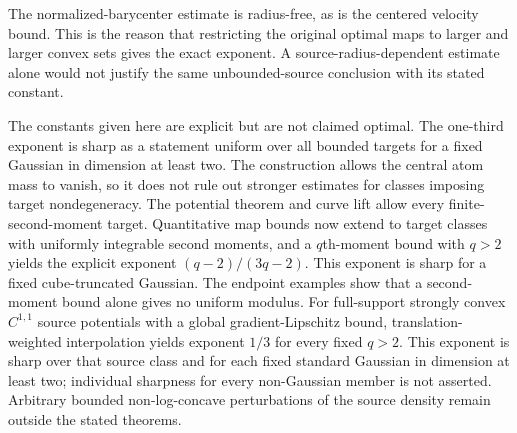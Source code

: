 \documentclass[11pt]{article}
\numberwithin{equation}{section}
\theoremstyle{remark}
\begin{document}
The normalized-barycenter estimate is radius-free, as is the centered velocity bound. This is the reason that restricting the original optimal maps to larger and larger convex sets gives the exact exponent. A source-radius-dependent estimate alone would not justify the same unbounded-source conclusion with its stated constant.

The constants given here are explicit but are not claimed optimal. The one-third exponent is sharp as a statement uniform over all bounded targets for a fixed Gaussian in dimension at least two. The construction allows the central atom mass to vanish, so it does not rule out stronger estimates for classes imposing target nondegeneracy. The potential theorem and curve lift allow every finite-second-moment target. Quantitative map bounds now extend to target classes with uniformly integrable second moments, and a $q$th-moment bound with $q>2$ yields the explicit exponent $(q-2)/(3q-2)$. This exponent is sharp for a fixed cube-truncated Gaussian. The endpoint examples show that a second-moment bound alone gives no uniform modulus. For full-support strongly convex $C^{1,1}$ source potentials with a global gradient-Lipschitz bound, translation-weighted interpolation yields exponent $1/3$ for every fixed $q>2$. This exponent is sharp over that source class and for each fixed standard Gaussian in dimension at least two; individual sharpness for every non-Gaussian member is not asserted. Arbitrary bounded non-log-concave perturbations of the source density remain outside the stated theorems.



\end{document}
